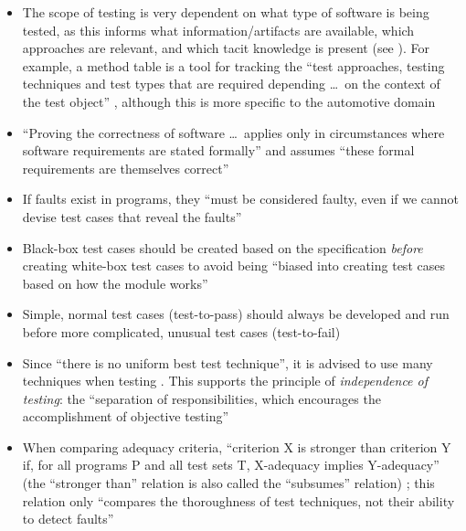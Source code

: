 \begin{itemize}
      \item The scope of testing is very dependent on what type of software
            is being tested, as this informs what information/artifacts are
            available, which approaches are relevant, and which tacit knowledge
            is present (see ). For example, a method table
            is a tool for tracking the ``test approaches, testing techniques
            and test types that are required depending \dots\ on the context of
            the test object''  , although
            this is more specific to the automotive domain
      \item ``Proving the correctness of software \dots\ applies only in
            circumstances where software requirements are stated formally'' and
            assumes ``these formal requirements are themselves correct''
            \citep[p.~398]{vanVliet2000}
      \item If faults exist in programs, they ``must be considered faulty, even
            if we cannot devise test cases that reveal the faults''
            \citep[p.~401]{vanVliet2000}
      \item Black-box test cases should be created based on the specification
            \emph{before} creating white-box test cases to avoid being ``biased
            into creating test cases based on how the module works''
            \citep[p.~113]{Patton2006}
      \item Simple, normal test cases (test-to-pass) should always be developed
            and run before more complicated, unusual test cases (test-to-fail)
            \citep[p.~66]{Patton2006}
      \item Since ``there is no uniform best test technique'', it is advised to
            use many techniques when testing \citep[p.~440]{vanVliet2000}.
            This supports the principle of \emph{independence of testing}: the
            ``separation of responsibilities, which encourages the
            accomplishment of objective testing'' 
      \item When comparing adequacy criteria, ``criterion X is stronger than
            criterion Y if, for all programs P and all test sets T, X-adequacy
            implies Y-adequacy'' (the ``stronger than'' relation is also called
            the ``subsumes'' relation) \citep[p.~432]{vanVliet2000};
            this relation only ``compares the thoroughness of test techniques,
            not their ability to detect faults'' \citep[p.~434]{vanVliet2000}
\end{itemize}

